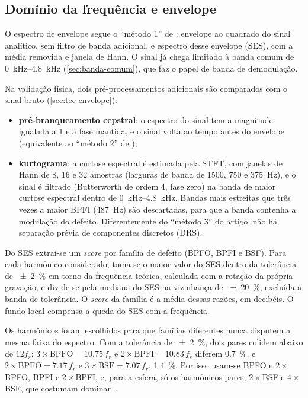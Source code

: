\subsection{Domínio da frequência e envelope}
\label{sec:features-envelope}

O espectro de envelope segue o ``método 1'' de \textcite[p.~104]{smith2015}:
envelope ao quadrado do sinal analítico, sem filtro de banda adicional, e
espectro desse envelope (SES), com a média removida e janela de Hann. O sinal já
chega limitado à banda comum de \SIrange{0}{4.8}{\kilo\hertz}
(\autoref{sec:banda-comum}), que faz o papel de banda de demodulação.

Na validação física, dois pré-processamentos adicionais são comparados com o
sinal bruto (\autoref{sec:tec-envelope}):
\begin{itemize}
  \item \textbf{pré-branqueamento cepstral}: o espectro do sinal tem a magnitude
  igualada a 1 e a fase mantida, e o sinal volta ao tempo antes do envelope
  (equivalente ao ``método 2'' de \textcite[p.~104]{smith2015});
  \item \textbf{kurtograma}: a curtose espectral é estimada pela STFT, com janelas
  de Hann de 8, 16 e 32 amostras (larguras de banda de 1500, 750 e
  \SI{375}{\hertz}), e o sinal é filtrado (Butterworth de ordem 4, fase zero) na
  banda de maior curtose espectral dentro de \SIrange{0}{4.8}{\kilo\hertz}.
  Bandas mais estreitas que três vezes a maior BPFI (\SI{487}{\hertz}) são
  descartadas, para que a banda contenha a modulação do defeito. Diferentemente
  do ``método 3'' do artigo, não há separação prévia de componentes discretos
  (DRS).
\end{itemize}

Do SES extrai-se um \emph{score} por família de defeito (BPFO, BPFI e BSF). Para cada
harmônico considerado, toma-se o maior valor do SES dentro da tolerância de
\SI{\pm 2}{\percent} em torno da frequência teórica, calculada com a rotação da
própria gravação, e divide-se pela mediana do SES na vizinhança de
\SI{\pm 20}{\percent}, excluída a banda de tolerância. O \emph{score} da família é a
média dessas razões, em decibéis. O fundo local compensa a queda do SES com a
frequência.

Os harmônicos foram escolhidos para que famílias diferentes nunca disputem a
mesma faixa do espectro. Com a tolerância de \SI{\pm 2}{\percent}, dois pares
colidem abaixo de $12 f_r$: $3 \times \text{BPFO} = \num{10.75}\,f_r$ e
$2 \times \text{BPFI} = \num{10.83}\,f_r$ diferem \SI{0.7}{\percent}, e
$2 \times \text{BPFO} = \num{7.17}\,f_r$ e $3 \times \text{BSF} = \num{7.07}\,f_r$,
\SI{1.4}{\percent}. Por isso usam-se BPFO e $2 \times$BPFO, BPFI e
$2 \times$BPFI, e, para a esfera, só os harmônicos pares, $2 \times$BSF e
$4 \times$BSF, que costumam dominar~\cite[p.~103]{smith2015}.

